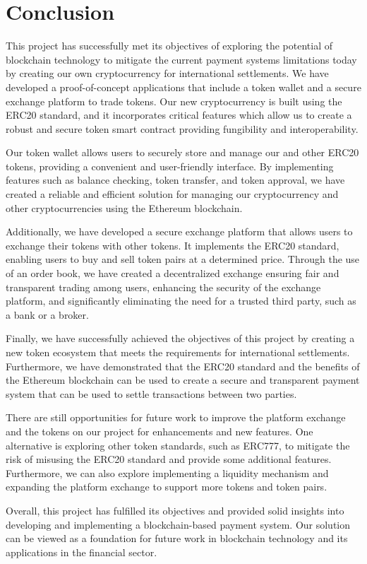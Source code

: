 \chapter{Conclusion}
\label{ch:conclusion}


This project has successfully met its objectives of exploring the potential of blockchain technology to mitigate the current
payment systems limitations today by creating our own cryptocurrency for international settlements. We have developed a proof-of-concept
applications that include a token wallet and a secure exchange platform to trade tokens. Our new cryptocurrency is built using the ERC20 standard, and it incorporates critical features which allow us to create a robust and secure token smart contract providing fungibility and interoperability.


Our token wallet allows users to securely store and manage our and other ERC20 tokens, providing
a convenient and user-friendly interface. By implementing features such as balance checking, token transfer,
and token approval, we have created a reliable and efficient solution for managing our cryptocurrency and other cryptocurrencies
using the Ethereum blockchain.


Additionally, we have developed a secure exchange platform that allows users to exchange their tokens with other tokens. It implements the ERC20 standard, enabling users to buy and sell token pairs at a determined price. Through the use of an order book, we have
created a decentralized exchange ensuring fair and transparent trading among users, enhancing the security of the exchange platform, and significantly eliminating the need for a trusted third party, such as a bank or a broker.


Finally, we have successfully achieved the objectives of this project by creating a new token ecosystem that meets the requirements
for international settlements. Furthermore, we have demonstrated that the ERC20 standard and the benefits of the Ethereum blockchain can be used
to create a secure and transparent payment system that can be used to settle transactions between two parties.


There are still opportunities for future work to improve the platform exchange and the tokens on our project for enhancements and
new features. One alternative is exploring other token standards, such as ERC777, to mitigate the risk of misusing
the ERC20 standard and provide some additional features. Furthermore, we can also explore implementing a liquidity mechanism
and expanding the platform exchange to support more tokens and token pairs.


Overall, this project has fulfilled its objectives and provided solid insights into developing and implementing a blockchain-based payment system. Our solution can be viewed as a foundation for future work in blockchain technology and its applications in the financial sector.








